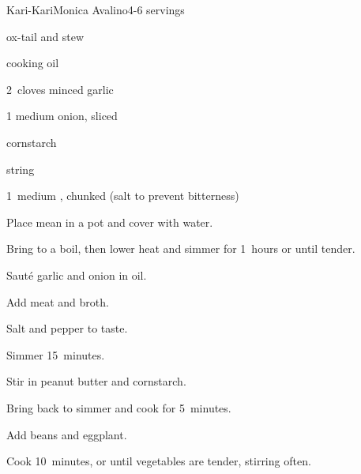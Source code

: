 \begin{recipe}{Kari-Kari}{Monica Avalino}{4-6 servings}

\begin{ingredients}
\item \lbs{2 \half} ox-tail and stew 
\item {} cooking oil
\item 2~cloves minced garlic
\item 1 medium onion, sliced
\item {} 
\item {} cornstarch
\item \lbs{\half} string 
\item 1~medium , chunked (salt to prevent bitterness)
\end{ingredients}

\begin{directions}
\item Place mean in a pot and cover with water.
\item Bring to a boil, then lower heat and simmer for 1\half~hours or until tender.
\item Saut\'e garlic and onion in oil.
\item Add meat and broth.
\item Salt and pepper to taste.
\item Simmer 15~minutes.
\item Stir in peanut butter and cornstarch.
\item Bring back to simmer and cook for 5~minutes.
\item Add beans and eggplant.
\item Cook 10~minutes, or until vegetables are tender, stirring often.

\end{directions}
\end{recipe}
